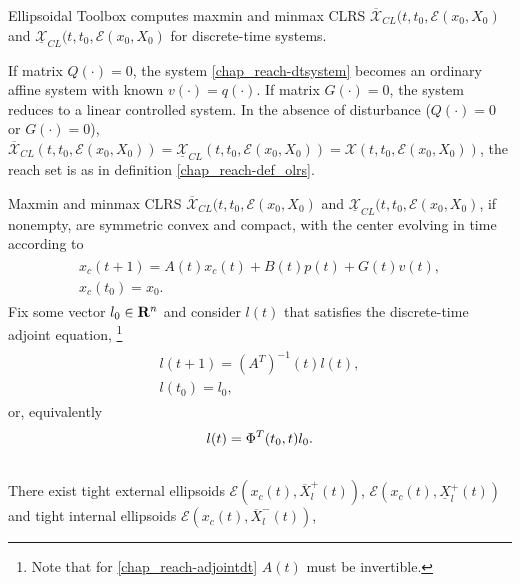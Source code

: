 \documentclass[letterpaper,10pt,english]{sphinxmanual}
\begin{document}
Ellipsoidal Toolbox computes maxmin and minmax CLRS
$\overline{{\mathcal X}}_{CL}(t, t_0, {\mathcal E}(x_0, X_0)$ and
$\underline{{\mathcal X}}_{CL}(t, t_0, {\mathcal E}(x_0, X_0)$ for
discrete-time systems.

If matrix $Q(\cdot)=0$, the system \eqref{chap_reach-dtsystem} becomes an
ordinary affine system with known $v(\cdot)=q(\cdot)$. If matrix
$G(\cdot)=0$, the system reduces to a linear controlled system. In
the absence of disturbance ($Q(\cdot)=0$ or $G(\cdot)=0$),
$\overline{{\mathcal X}}_{CL}(t,t_0,{\mathcal E}(x_0,X_0))=\underline{{\mathcal X}}_{CL}(t,t_0,{\mathcal E}(x_0,X_0))={\mathcal X}(t,t_0,{\mathcal E}(x_0,X_0))$,
the reach set is as in definition \eqref{chap_reach-def_olrs}.

Maxmin and minmax CLRS
$\overline{{\mathcal X}}_{CL}(t, t_0, {\mathcal E}(x_0, X_0)$ and
$\underline{{\mathcal X}}_{CL}(t, t_0, {\mathcal E}(x_0, X_0)$, if
nonempty, are symmetric convex and compact, with the center evolving in
time according to
\label{chap_reach:equation-fwdcenterd}\begin{gather}
\begin{split}x_c(t+1) = A(t)x_c(t) + B(t)p(t) + G(t)v(t), \\
x_c(t_0)= x_0.\end{split}\label{chap_reach-fwdcenterd}
\end{gather}
Fix some vector $l_0\in{\bf R}^n$ and consider $l(t)$ that
satisfies the discrete-time adjoint equation, \footnote{
Note that for \eqref{chap_reach-adjointdt} $A(t)$ must be invertible.
}
\label{chap_reach:equation-adjointdt}\begin{gather}
\begin{split}l(t+1) = \left(A^T\right)^{-1}(t)l(t), \\
l(t_0) = l_0,\end{split}\label{chap_reach-adjointdt}
\end{gather}
or, equivalently
\begin{gather}
\begin{split}l(t) = \Phi^T(t_0, t)l_0 .\end{split}\notag\\\begin{split}\end{split}\notag
\end{gather}
There exist tight external ellipsoids
${\mathcal E}(x_c(t), \overline{X}^+_l(t))$,
${\mathcal E}(x_c(t), \underline{X}^+_l(t))$ and tight internal
ellipsoids ${\mathcal E}(x_c(t), \overline{X}^-_l(t))$,
\end{document}
